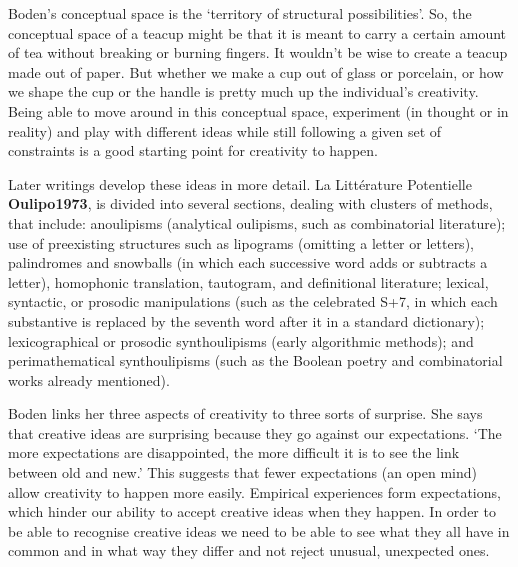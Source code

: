 \begin{leftbar}
Boden's conceptual space is the `territory of structural possibilities'. So, the conceptual space of a teacup might be that it is meant to carry a certain amount of tea without breaking or burning fingers. It wouldn't be wise to create a teacup made out of paper. But whether we make a cup out of glass or porcelain, or how we shape the cup or the handle is pretty much up the individual's creativity. Being able to move around in this conceptual space, experiment (in thought or in reality) and play with different ideas while still following a given set of constraints is a good starting point for creativity to happen.
\end{leftbar}

%
\begin{leftbar}
Later writings develop these ideas in more detail. La Littérature Potentielle \textbf{Oulipo1973}, is divided into several sections, dealing with clusters of methods, that include: anoulipisms (analytical oulipisms, such as combinatorial literature); use of preexisting structures such as lipograms (omitting a letter or letters), palindromes and snowballs (in which each successive word adds or subtracts a letter), homophonic translation, tautogram, and definitional literature; lexical, syntactic, or prosodic manipulations (such as the celebrated S+7, in which each substantive is replaced by the seventh word after it in a standard dictionary); lexicographical or prosodic synthoulipisms (early algorithmic methods); and perimathematical synthoulipisms (such as the Boolean poetry and combinatorial works already mentioned).
\end{leftbar}

\begin{leftbar}
Boden links her three aspects of creativity to three sorts of surprise. She says that creative ideas are surprising because they go against our expectations. `The more expectations are disappointed, the more difficult it is to see the link between old and new.' \autocite[p.84]{Boden2003} This suggests that fewer expectations (an open mind) allow creativity to happen more easily. Empirical experiences form expectations, which hinder our ability to accept creative ideas when they happen. In order to be able to recognise creative ideas we need to be able to see what they all have in common and in what way they differ and not reject unusual, unexpected ones.
\end{leftbar}

